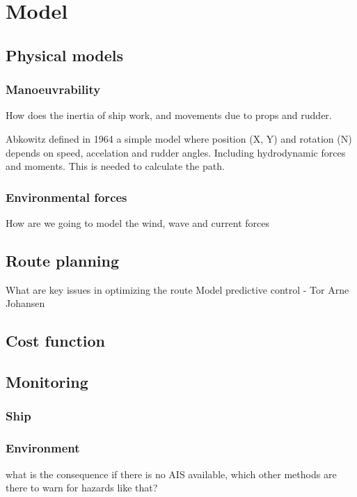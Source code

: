 \chapter{Model}

\section{Physical models}

\subsection{Manoeuvrability}
How does the inertia of ship work, and movements due to props and rudder.

Abkowitz defined in 1964 a simple model where position (X, Y) and rotation (N) depends on speed, accelation and rudder angles. Including hydrodynamic forces and moments. This is needed to calculate the path. 

\subsection{Environmental forces}
How are we going to model the wind, wave and current forces

\section{Route planning}
What are key issues in optimizing the route
Model predictive control - Tor Arne Johansen

\section{Cost function}

\section{Monitoring}
\subsection{Ship}

\subsection{Environment}
what is the consequence if there is no AIS available, which other methods are there to warn for hazards like that?

